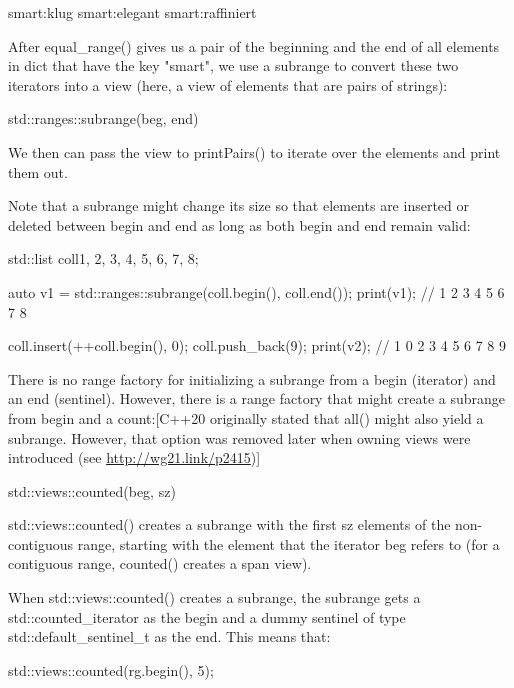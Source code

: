 \begin{shell}
smart:klug smart:elegant smart:raffiniert
\end{shell}

After equal\_range() gives us a pair of the beginning and the end of all elements in dict that have the key "smart", we use a subrange to convert these two iterators into a view (here, a view of elements that are pairs of strings):

\begin{cpp}
std::ranges::subrange(beg, end)
\end{cpp}

We then can pass the view to printPairs() to iterate over the elements and print them out.

Note that a subrange might change its size so that elements are inserted or deleted between begin and end as long as both begin and end remain valid:

\begin{cpp}
std::list coll{1, 2, 3, 4, 5, 6, 7, 8};

auto v1 = std::ranges::subrange(coll.begin(), coll.end());
print(v1); // 1 2 3 4 5 6 7 8

coll.insert(++coll.begin(), 0);
coll.push_back(9);
print(v2); // 1 0 2 3 4 5 6 7 8 9
\end{cpp}


There is no range factory for initializing a subrange from a begin (iterator) and an end (sentinel). However, there is a range factory that might create a subrange from begin and a count:[C++20 originally stated that all() might also yield a subrange. However, that option was removed later when owning views were introduced (see \url{http://wg21.link/p2415})]

\begin{cpp}
std::views::counted(beg, sz)
\end{cpp}

std::views::counted() creates a subrange with the first sz elements of the non-contiguous range, starting with the element that the iterator beg refers to (for a contiguous range, counted() creates a span view).

When std::views::counted() creates a subrange, the subrange gets a std::counted\_iterator as the begin and a dummy sentinel of type std::default\_sentinel\_t as the end. This means that:

\begin{cpp}
std::views::counted(rg.begin(), 5);
\end{cpp}

